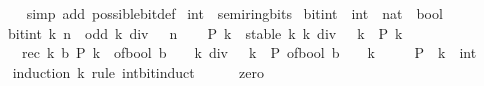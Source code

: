 \begin{isabellebody}
\ \ \ \ \isamarkupfalse%
\ {\isacharparenleft}{\kern0pt}simp\ add{\isacharcolon}{\kern0pt}\ possible{\isacharunderscore}{\kern0pt}bit{\isacharunderscore}{\kern0pt}def{\isacharparenright}{\kern0pt}\isanewline
{}\isamarkupfalse%
%
\endisatagproof
{\isafoldproof}%
%
\isadelimproof
\isanewline
%
\endisadelimproof
\isanewline
{}\isamarkupfalse%
\isanewline
\isanewline
{}\isamarkupfalse%
\ int\ {\isacharcolon}{\kern0pt}{\isacharcolon}{\kern0pt}\ semiring{\isacharunderscore}{\kern0pt}bits\isanewline
{}\isanewline
\isanewline
{}\isamarkupfalse%
\ bit{\isacharunderscore}{\kern0pt}int\ {\isacharcolon}{\kern0pt}{\isacharcolon}{\kern0pt}\ {\isacartoucheopen}int\ {\isasymRightarrow}\ nat\ {\isasymRightarrow}\ bool{\isacartoucheclose}\isanewline
\ \ \ {\isacartoucheopen}bit{\isacharunderscore}{\kern0pt}int\ k\ n\ {\isasymlongleftrightarrow}\ odd\ {\isacharparenleft}{\kern0pt}k\ div\ {}\ {\isacharcircum}{\kern0pt}\ n{\isacharparenright}{\kern0pt}{\isacartoucheclose}\isanewline
\isanewline
{}\isamarkupfalse%
\isanewline
%
\isadelimproof
%
\endisadelimproof
%
\isatagproof
{}\isamarkupfalse%
\isanewline
\ \ \isamarkupfalse%
\ {\isacartoucheopen}P\ k{\isacartoucheclose}\ \ stable{\isacharcolon}{\kern0pt}\ {\isacartoucheopen}{\isasymAnd}k{\isachardot}{\kern0pt}\ k\ div\ {}\ {\isacharequal}{\kern0pt}\ k\ {\isasymLongrightarrow}\ P\ k{\isacartoucheclose}\isanewline
\ \ \ \ \ rec{\isacharcolon}{\kern0pt}\ {\isacartoucheopen}{\isasymAnd}k\ b{\isachardot}{\kern0pt}\ P\ k\ {\isasymLongrightarrow}\ {\isacharparenleft}{\kern0pt}of{\isacharunderscore}{\kern0pt}bool\ b\ {\isacharplus}{\kern0pt}\ {}\ {\isacharasterisk}{\kern0pt}\ k{\isacharparenright}{\kern0pt}\ div\ {}\ {\isacharequal}{\kern0pt}\ k\ {\isasymLongrightarrow}\ P\ {\isacharparenleft}{\kern0pt}of{\isacharunderscore}{\kern0pt}bool\ b\ {\isacharplus}{\kern0pt}\ {}\ {\isacharasterisk}{\kern0pt}\ k{\isacharparenright}{\kern0pt}{\isacartoucheclose}\isanewline
\ \ \ \ \ P\ \ k\ {\isacharcolon}{\kern0pt}{\isacharcolon}{\kern0pt}\ int\isanewline
\ \ \isamarkupfalse%
\ {\isacharparenleft}{\kern0pt}induction\ k\ rule{\isacharcolon}{\kern0pt}\ int{\isacharunderscore}{\kern0pt}bit{\isacharunderscore}{\kern0pt}induct{\isacharparenright}{\kern0pt}\isanewline
\ \ \ \ \isamarkupfalse%
\ zero\isanewline
\ \ \ \ \isamarkupfalse%

\end{isabellebody}

